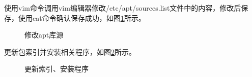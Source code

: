\documentclass[UTF8]{ctexart}
\begin{document}
    使用vim命令调用vim编辑器修改/etc/apt/sources.list文件中的内容，修改后保存，使用cat命令确认保存成功，如图\ref{source list}所示。
    \begin{figure}[H]
        \centering
        \caption{修改apt库源}
        \label{source list}
    \end{figure}

    更新包索引并安装相关程序，如图\ref{update install}所示。
    \begin{figure}[H]
        \centering
        \caption{更新索引、安装程序}
        \label{update install}
    \end{figure}
\end{document}
